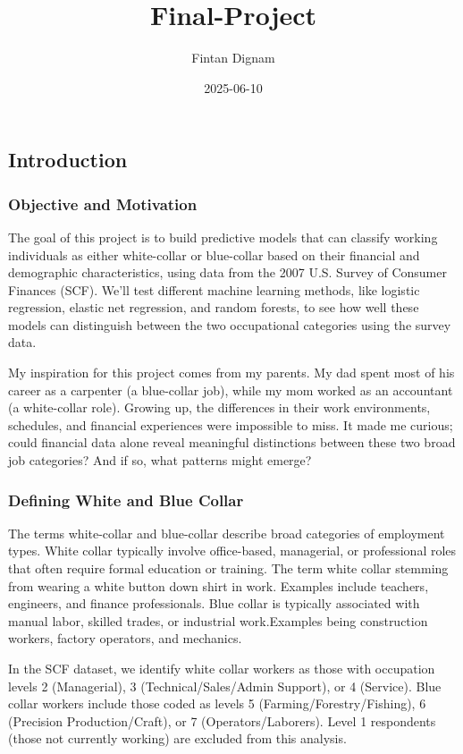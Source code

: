\documentclass[
]{article}
\title{Final-Project}
\author{Fintan Dignam}
\date{2025-06-10}
\begin{document}
\maketitle

\subsection{Introduction}\label{introduction}

\subsubsection{Objective and Motivation}\label{objective-and-motivation}

The goal of this project is to build predictive models that can classify
working individuals as either white-collar or blue-collar based on their
financial and demographic characteristics, using data from the 2007 U.S.
Survey of Consumer Finances (SCF). We'll test different machine learning
methods, like logistic regression, elastic net regression, and random
forests, to see how well these models can distinguish between the two
occupational categories using the survey data.

My inspiration for this project comes from my parents. My dad spent most
of his career as a carpenter (a blue-collar job), while my mom worked as
an accountant (a white-collar role). Growing up, the differences in
their work environments, schedules, and financial experiences were
impossible to miss. It made me curious; could financial data alone
reveal meaningful distinctions between these two broad job categories?
And if so, what patterns might emerge?

\subsubsection{Defining White and Blue
Collar}\label{defining-white-and-blue-collar}

The terms white-collar and blue-collar describe broad categories of
employment types. White collar typically involve office-based,
managerial, or professional roles that often require formal education or
training. The term white collar stemming from wearing a white button
down shirt in work. Examples include teachers, engineers, and finance
professionals. Blue collar is typically associated with manual labor,
skilled trades, or industrial work.Examples being construction workers,
factory operators, and mechanics.

In the SCF dataset, we identify white collar workers as those with
occupation levels 2 (Managerial), 3 (Technical/Sales/Admin Support), or
4 (Service). Blue collar workers include those coded as levels 5
(Farming/Forestry/Fishing), 6 (Precision Production/Craft), or 7
(Operators/Laborers). Level 1 respondents (those not currently working)
are excluded from this analysis.
\end{document}
